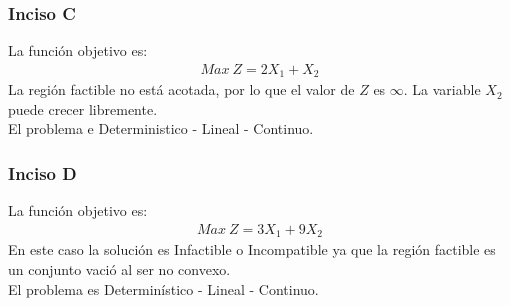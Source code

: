 \documentclass{tarea}
\begin{document}
\begin{homeworkProblem}
\subsubsection{Inciso C}
La función objetivo es:
\begin{align*}
	Max\ Z = 2X_1 + X_2
\end{align*}
La región factible no está acotada, por lo que el valor de $Z$ es $\infty$. La variable $X_2$ puede crecer libremente. \\
El problema e Deterministico - Lineal - Continuo.

\subsubsection{Inciso D}
La función objetivo es: 
\begin{align*}
	Max\ Z = 3X_1 + 9X_2
\end{align*}
En este caso la solución es Infactible o Incompatible ya que la región factible es un conjunto vació al ser no convexo. \\
El problema es Determinístico - Lineal - Continuo.
\end{homeworkProblem}
\end{document}
